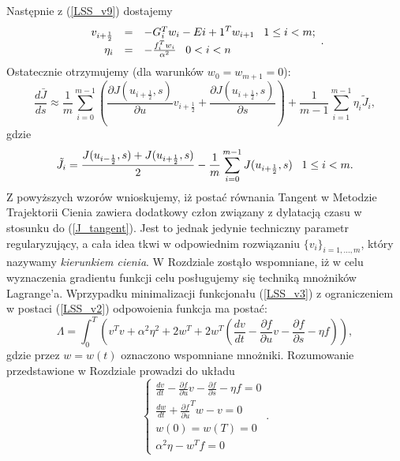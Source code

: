 \documentclass[12pt]{article}
\begin{document}
Następnie z (\ref{LSS_v9}) dostajemy
\begin{equation}
\begin{array}{rcl}
v_{i+\frac{1}{2}} &=&  -G_{i}^{T}w_{i} - E{i+1}^{T}w_{i+1} \thickspace \thickspace \thickspace 1\leq i <m;\\
\eta_{i} &=& -\frac{f_{i}^{T}w_{i}}{\alpha^{2}} \thickspace \thickspace \thickspace 0<i<n
\end{array}.
\label{LSS_v18}
\end{equation}
Ostatecznie otrzymujemy (dla warunków $ w_{0} = w_{m+1} = 0  $):
\begin{equation}
\frac{d\bar{J}}{ds} \approx \frac{1}{m}\sum_{i=0}^{m-1}(\frac{\partial{J(u_{i+\frac{1}{2}},s)}}{\partial{u}}v_{i+\frac{1}{2}} + \frac{\partial{J(u_{i+\frac{1}{2}},s)}}{\partial{s}}) + \frac{1}{m-1}\sum_{i=1}^{m-1}\eta_{i}\tilde{J}_{i},
\label{LSS_v19}
\end{equation}
gdzie 
\begin{equation}
\tilde{J}_{i} = \frac{J(u_{i-\frac{1}{2}},s)+J(u_{i+\frac{1}{2}},s)}{2} - \frac{1}{m}\sum_{i=0}^{m-1}J(u_{i+\frac{1}{2}},s) \thickspace \thickspace \thickspace 1\leq i < m.
\label{LSS_v20}
\end{equation}
Z powyższych wzorów wnioskujemy, iż postać równania Tangent w Metodzie Trajektorii Cienia zawiera dodatkowy człon związany z dylatacją czasu w stosunku do (\ref{J_tangent}). Jest to jednak jedynie techniczny parametr regularyzujący, a cała idea tkwi w odpowiednim rozwiązaniu $ \{v_{i}\}_{i=1,...,m} $, który nazywamy \textit{kierunkiem cienia}.
W Rozdziale zostąło wspomniane, iż w celu wyznaczenia gradientu funkcji celu posługujemy się techniką mnożników Lagrange'a. Wprzypadku minimalizacji funkcjonału (\ref{LSS_v3}) z ograniczeniem w postaci (\ref{LSS_v2}) odpowoienia funkcja ma postać:
\begin{equation}
\Lambda = \int_{0}^{T}(v^{T}v + \alpha^{2}\eta^{2}+2w^{T} + 2w^{T}(\frac{dv}{dt}-\frac{\partial{f}}{\partial{u}}v-\frac{\partial{f}}{\partial{s}}-\eta f)),
\label{LSS_v21}
\end{equation}
gdzie przez $ w = w(t) $ oznaczono wspomniane mnożniki. Rozumowanie przedstawione w Rozdziale prowadzi do układu
\begin{equation}
\begin{cases}
	\frac{dv}{dt}-\frac{\partial{f}}{\partial{u}}v-\frac{\partial{f}}{\partial{s}}-\eta f = 0 \\
	\frac{dw}{dt} + \frac{\partial{f}}{\partial{u}}^{T}w-v = 0 \\
	w(0) = w(T) = 0 \\
	\alpha^{2}\eta -w^{T}f = 0
\end{cases}.
\label{LSS_v22}
\end{equation}
\end{document}
